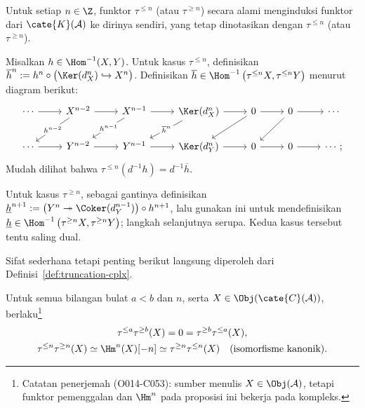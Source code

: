 \begin{definisiproposisi}\label{def:K-truncation-functors}
	Untuk setiap $n \in \Z$, funktor $\tau^{\leq n}$ (atau
	$\tau^{\geq n}$) secara alami menginduksi funktor dari
	$\cate{K}(\mathcal{A})$ ke dirinya sendiri, yang tetap dinotasikan dengan
	$\tau^{\leq n}$ (atau $\tau^{\geq n}$).
\end{definisiproposisi}
\begin{bukti}
	Misalkan $h \in \Hom^{-1}(X, Y)$. Untuk kasus $\tau^{\leq n}$, definisikan
	$\overline{h}^n := h^n \circ \bigl(\Ker(d_X^n) \hookrightarrow X^n\bigr)$.
	Definisikan $\overline{h} \in
	\Hom^{-1}\left( \tau^{\leq n} X, \tau^{\leq n} Y \right)$ menurut
	diagram berikut:
	\[\begin{tikzcd}
		\cdots \arrow[r] & X^{n-2} \arrow[r] \arrow[ld, "h^{n-2}" description] & X^{n-1} \arrow[r] \arrow[ld, "{h^{n-1}}" description] & \Ker(d_X^n) \arrow[r] \arrow[ld, "{\overline{h}^n}" description] & 0 \arrow[r] \arrow[ld] & 0 \arrow[r] \arrow[ld] & \cdots \\
		\cdots \arrow[r] & Y^{n-2} \arrow[r] & Y^{n-1} \arrow[r] & \Ker(d_Y^n) \arrow[r] & 0 \arrow[r] & 0 \arrow[r] & \cdots ;
	\end{tikzcd}\]
	Mudah dilihat bahwa
	$\tau^{\leq n}\left( d^{-1} h \right) = d^{-1} \overline{h}$.
	
	Untuk kasus $\tau^{\geq n}$, sebagai gantinya definisikan
	$\underline{h}^{n+1} := \bigl(Y^n \twoheadrightarrow
	\Coker(d_Y^{n-1})\bigr) \circ h^{n+1}$, lalu gunakan ini untuk
	mendefinisikan $\underline{h} \in
	\Hom^{-1}\left( \tau^{\geq n} X, \tau^{\geq n} Y \right)$; langkah
	selanjutnya serupa. Kedua kasus tersebut tentu saling dual.
\end{bukti}

Sifat sederhana tetapi penting berikut langsung diperoleh dari
Definisi~\ref{def:truncation-cplx}.

\begin{proposisi}\label{prop:truncate-twice}
	Untuk semua bilangan bulat $a < b$ dan $n$, serta
	$X \in \Obj(\cate{C}(\mathcal{A}))$, berlaku\footnote{Catatan penerjemah
	(O014-C053): sumber menulis $X \in \Obj(\mathcal{A})$, tetapi funktor
	pemenggalan dan $\Hm^n$ pada proposisi ini bekerja pada kompleks.}
	\begin{gather*}
		\tau^{\leq a} \tau^{\geq b}(X) = 0 = \tau^{\geq b} \tau^{\leq a}(X), \\
		\tau^{\leq n }\tau^{\geq n}(X) \simeq \Hm^n(X)[-n] \simeq \tau^{\geq n} \tau^{\leq n}(X) \quad \text{(isomorfisme kanonik).}
	\end{gather*}
\end{proposisi}
